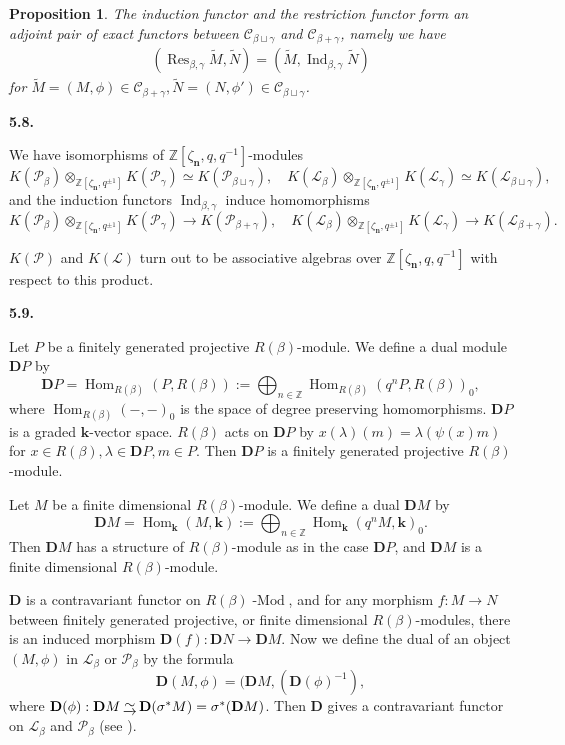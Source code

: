 \documentclass[12pt]{amsart}
\renewcommand\b{\beta}
\newcommand\g{\gamma}
\newcommand\la{\lambda}
\newcommand\z{\zeta}
\newcommand\s{\sigma}
\newcommand\f{\phi}
\renewcommand{\1}{\mathbb 1}
\newcommand{\ZZ}{\mathbb Z}
\newcommand\BD{\mathbf D}
\newcommand\Bk{\mathbf k}
\newcommand\Bn{\mathbf n}
\newcommand\SC{\mathscr{C}}
\newcommand\SL{\mathscr{L}}
\newcommand\SP{\mathscr{P}}
\newcommand\iv{^{-1}}
\newcommand\wt{\widetilde}
\newcommand\Hom{\operatorname{Hom}}
\newcommand\Ind{\operatorname{Ind}}
\newcommand\Res{\operatorname{Res}}
\newcommand\Mod{\operatorname{-Mod}}
\newcommand{\isom}{\,\raise2pt\hbox{$\underrightarrow{\sim}$}\,}
\numberwithin{equation}{section}
\newtheorem{prop}[thm]{Proposition}
\def \para#1{\par\medskip\textbf{#1}
              \addtocounter{thm}{1}}
\begin{document}
\begin{prop}  %
The induction functor and the restriction
functor form an adjoint pair of exact functors between
$\SC_{\b \sqcup \g}$ and $\SC_{\b + \g}$, namely we have
\begin{align*}
\tag{5.7.1}  
 (\Res_{\b,\g}\wt M, \wt N) = (\wt M, \Ind_{\b,\g}\wt N)
\end{align*}
for $\wt M  = (M,\f) \in \SC_{\b+\g}, \wt N  = (N, \f') \in \SC_{\b \sqcup \g}$. 
\end{prop}

\para{5.8.}
We have isomorphisms of $\ZZ[\z_{\Bn}, q,q\iv]$-modules
\begin{equation*}
  K(\SP_{\b})\otimes_{\ZZ[\z_{\Bn},q^{\pm 1}]}K(\SP_{\g}) \simeq K(\SP_{\b \sqcup \g}), \quad
  K(\SL_{\b})\otimes_{\ZZ[\z_{\Bn},q^{\pm 1}]}K(\SL_{\g}) \simeq K(\SL_{\b \sqcup \g}),   
\end{equation*}
and the induction functors $\Ind_{\b,\g}$ induce homomorphisms
\begin{equation*}
  K(\SP_{\b})\otimes_{\ZZ[\z_{\Bn}, q^{\pm 1}]}K(\SP_{\g}) \to K(\SP_{\b+\g}), \quad
  K(\SL_{\b}) \otimes_{\ZZ[\z_{\Bn}, q^{\pm 1}]}K(\SL_{\g}) \to K(\SL_{\b+\g}).
\end{equation*}

$K(\SP)$ and $K(\SL)$ turn out to be associative algebras over $\ZZ[\z_{\Bn}, q, q\iv]$
with respect to this product. 

\para{5.9.}
Let $P$ be a finitely generated projective $R(\b)$-module. We define a dual
module $\BD P$ by
\begin{equation*}
\BD P = \Hom_{R(\b)}(P, R(\b)) := \bigoplus_{n \in \ZZ}\Hom_{R(\b)}(q^nP, R(\b))_0,
\end{equation*}
where $\Hom_{R(\b)}(-,-)_0$ is the space of degree preserving homomorphisms.
$\BD P$ is a graded $\Bk$-vector space. $R(\b)$ acts on $\BD P$ by
$x(\la)(m) = \la(\psi(x)m)$ for $x \in R(\b), \la \in \BD P, m \in P$. 
Then $\BD P$ is a finitely generated projective $R(\b)$-module. 

\par
Let $M$ be a finite dimensional $R(\b)$-module. We define a dual $\BD M$ by
\begin{equation*}
\BD M = \Hom_{\Bk}(M, \Bk) := \bigoplus_{n \in \ZZ}\Hom_{\Bk}(q^nM, \Bk)_0.
\end{equation*}
Then $\BD M$ has a structure of $R(\b)$-module as in the case $\BD P$, and
$\BD M $ is a finite dimensional $R(\b)$-module.
\par
$\BD$ is a contravariant functor on $R(\b)\Mod$, and for any morphism
$f : M \to N$ between finitely generated projective, or finite dimensional
$R(\b)$-modules, there is an induced morphism $\BD(f) : \BD N \to \BD M$.
Now we define the dual of an object $(M, \f)$ in $\SL_{\b}$ or $\SP_{\b}$
by the formula
\begin{equation*}
\BD(M,\f) = (\BD M, (\BD(\f)\iv),
\end{equation*}
where $\BD(\f) : \BD M \isom \BD(\s^*M) = \s^*(\BD M)$.
Then $\BD$ gives a contravariant functor on $\SL_{\b}$ and $\SP_{\b}$
(see \cite[5]{M}).
\end{document}
